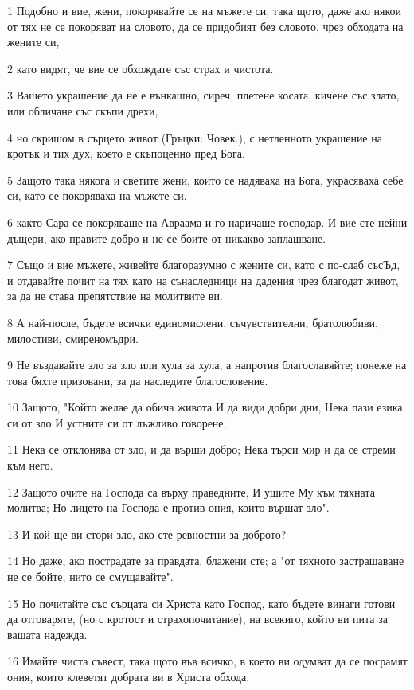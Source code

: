 \par 1 Подобно и вие, жени, покорявайте се на мъжете си, така щото, даже ако някои от тях не се покоряват на словото, да се придобият без словото, чрез обходата на жените си,
\par 2 като видят, че вие се обхождате със страх и чистота.
\par 3 Вашето украшение да не е вънкашно, сиреч, плетене косата, кичене със злато, или обличане със скъпи дрехи,
\par 4 но скришом в сърцето живот (Гръцки: Човек.), с нетленното украшение на кротък и тих дух, което е скъпоценно пред Бога.
\par 5 Защото така някога и светите жени, които се надяваха на Бога, украсяваха себе си, като се покоряваха на мъжете си.
\par 6 както Сара се покоряваше на Авраама и го наричаше господар. И вие сте нейни дъщери, ако правите добро и не се боите от никакво заплашване.
\par 7 Също и вие мъжете, живейте благоразумно с жените си, като с по-слаб съсЪд, и отдавайте почит на тях като на сънаследници на дадения чрез благодат живот, за да не става препятствие на молитвите ви.
\par 8 А най-после, бъдете всички единомислени, съчувствителни, братолюбиви, милостиви, смиреномъдри.
\par 9 Не въздавайте зло за зло или хула за хула, а напротив благославяйте; понеже на това бяхте призовани, за да наследите благословение.
\par 10 Защото, "Който желае да обича живота И да види добри дни, Нека пази езика си от зло И устните си от лъжливо говорене;
\par 11 Нека се отклонява от зло, и да върши добро; Нека търси мир и да се стреми към него.
\par 12 Защото очите на Господа са върху праведните, И ушите Му към тяхната молитва; Но лицето на Господа е против ония, които вършат зло".
\par 13 И кой ще ви стори зло, ако сте ревностни за доброто?
\par 14 Но даже, ако пострадате за правдата, блажени сте; а "от тяхното застрашаване не се бойте, нито се смущавайте".
\par 15 Но почитайте със сърцата си Христа като Господ, като бъдете винаги готови да отговаряте, (но с кротост и страхопочитание), на всекиго, който ви пита за вашата надежда.
\par 16 Имайте чиста съвест, така щото във всичко, в което ви одумват да се посрамят ония, които клеветят добрата ви в Христа обхода.
